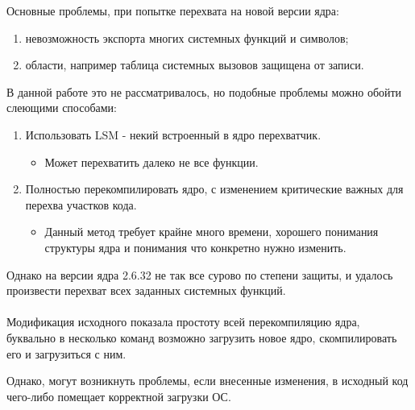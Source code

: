 Основные проблемы, при попытке перехвата на новой версии ядра:
\begin{enumerate}
\item невозможность экспорта многих системных функций и символов;
\item области, например таблица системных вызовов защищена от записи.
\end{enumerate}
В данной работе это не рассматривалось, но подобные проблемы можно обойти слеющими способами:
\begin{enumerate}
\item Использовать LSM - некий встроенный в ядро перехватчик. 
\begin{itemize}
\item Может перехватить далеко не все функции.
\end{itemize}
\item Полностью перекомпилировать ядро, с изменением критические важных для перехва участков кода. 
\begin{itemize}
\item Данный метод требует крайне много времени, хорошего понимания структуры ядра и понимания что конкретно нужно изменить.
\end{itemize}
\end{enumerate}
Однако на версии ядра 2.6.32 не так все сурово по степени защиты, и удалось произвести перехват всех заданных системных функций.\\\\
Модификация исходного показала простоту всей перекомпиляцию ядра, буквально в несколько команд возможно загрузить новое ядро, скомпилировать его и загрузиться с ним.

Однако, могут возникнуть проблемы, если внесенные изменения, в исходный код чего-либо помещает корректной загрузки ОС.




\clearpage
{}




\nocite{anatomy}

